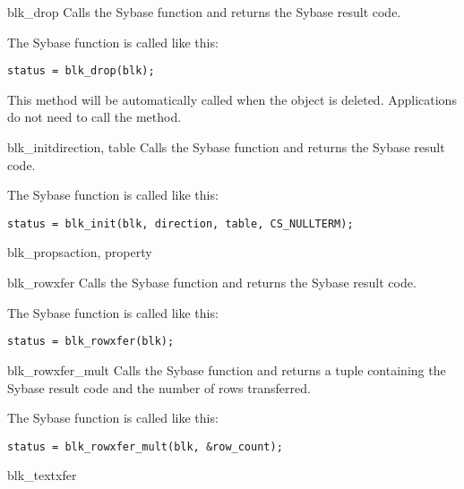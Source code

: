\begin{methoddesc}[CS_BLKDESC]{blk_drop}{}
Calls the Sybase  function and returns the Sybase
result code.

The Sybase  function is called like this:

\begin{verbatim}
status = blk_drop(blk);
\end{verbatim}

This method will be automatically called when the 
object is deleted.  Applications do not need to call the method.
\end{methoddesc}

\begin{methoddesc}[CS_BLKDESC]{blk_init}{direction, table}
Calls the Sybase  function and returns the Sybase
result code.

The Sybase  function is called like this:

\begin{verbatim}
status = blk_init(blk, direction, table, CS_NULLTERM);
\end{verbatim}
\end{methoddesc}

\begin{methoddesc}[CS_BLKDESC]{blk_props}{action, property }
\end{methoddesc}

\begin{methoddesc}[CS_BLKDESC]{blk_rowxfer}{}
Calls the Sybase  function and returns the
Sybase result code.

The Sybase  function is called like this:

\begin{verbatim}
status = blk_rowxfer(blk);
\end{verbatim}
\end{methoddesc}

\begin{methoddesc}[CS_BLKDESC]{blk_rowxfer_mult}{}
Calls the Sybase  function and returns a
tuple containing the Sybase result code and the number of rows
transferred.

The Sybase  function is called like this:

\begin{verbatim}
status = blk_rowxfer_mult(blk, &row_count);
\end{verbatim}
\end{methoddesc}

\begin{methoddesc}[CS_BLKDESC]{blk_textxfer}{}
\end{methoddesc}
